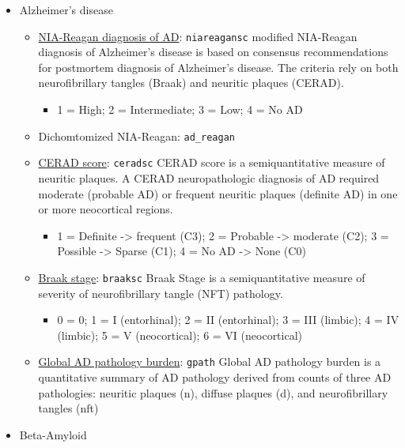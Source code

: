 \documentclass[]{book}
\providecommand{\tightlist}{%
  \setlength{\itemsep}{0pt}\setlength{\parskip}{0pt}}
\begin{document}
\begin{itemize}
\tightlist
\item
  Alzheimer's disease

  \begin{itemize}
  \tightlist
  \item
    \href{https://www.radc.rush.edu/docs/var/detail.htm?category=Pathology\&subcategory=Alzheimer\%27s+disease\&variable=niareagansc}{NIA-Reagan diagnosis of AD}: \texttt{niareagansc} modified NIA-Reagan diagnosis of Alzheimer's disease is based on consensus recommendations for postmortem diagnosis of Alzheimer's disease. The criteria rely on both neurofibrillary tangles (Braak) and neuritic plaques (CERAD).

    \begin{itemize}
    \tightlist
    \item
      1 = High; 2 = Intermediate; 3 = Low; 4 = No AD
    \end{itemize}
  \item
    Dichomtomized NIA-Reagan: \texttt{ad\_reagan}
  \item
    \href{https://www.radc.rush.edu/docs/var/detail.htm?category=Pathology\&subcategory=Alzheimer\%27s+disease\&variable=ceradsc}{CERAD score}: \texttt{ceradsc} CERAD score is a semiquantitative measure of neuritic plaques. A CERAD neuropathologic diagnosis of AD required moderate (probable AD) or frequent neuritic plaques (definite AD) in one or more neocortical regions.

    \begin{itemize}
    \tightlist
    \item
      1 = Definite -\textgreater{} frequent (C3); 2 = Probable -\textgreater{} moderate (C2); 3 = Possible -\textgreater{} Sparse (C1); 4 = No AD -\textgreater{} None (C0)
    \end{itemize}
  \item
    \href{https://www.radc.rush.edu/docs/var/detail.htm?category=Pathology\&subcategory=Alzheimer\%27s+disease\&variable=braaksc}{Braak stage}: \texttt{braaksc} Braak Stage is a semiquantitative measure of severity of neurofibrillary tangle (NFT) pathology.

    \begin{itemize}
    \tightlist
    \item
      0 = 0; 1 = I (entorhinal); 2 = II (entorhinal); 3 = III (limbic); 4 = IV (limbic); 5 = V (neocortical); 6 = VI (neocortical)
    \end{itemize}
  \item
    \href{https://www.radc.rush.edu/docs/var/detail.htm?category=Pathology\&subcategory=Alzheimer\%27s+disease\&variable=gpath}{Global AD pathology burden}: \texttt{gpath} Global AD pathology burden is a quantitative summary of AD pathology derived from counts of three AD pathologies: neuritic plaques (n), diffuse plaques (d), and neurofibrillary tangles (nft)
  \end{itemize}
\item
  Beta-Amyloid


\end{itemize}
\end{document}
